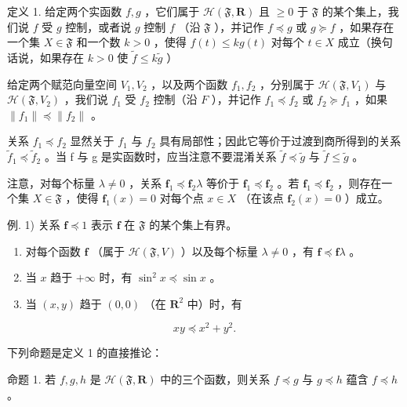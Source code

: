 定义 1. 给定两个实函数 \(f, g\) ，它们属于 \(\mathcal{H}(\mathfrak{F}, \mathbf{R})\) 且 \(\geqslant 0\) 于 \(\mathfrak{F}\) 的某个集上，我们说 \(f\) 受 \(g\) 控制，或者说 \(g\) 控制 \(f\) （沿 \(\mathfrak{F}\) ），并记作 \(f \preccurlyeq g\) 或 \(g \succcurlyeq f\) ，如果存在一个集 \(X \in \mathfrak{F}\) 和一个数 \(k > 0\) ，使得 \(f(t) \leqslant k g(t)\) 对每个 \(t \in X\) 成立（换句话说，如果存在 \(k > 0\) 使 \(\tilde{f} \leqslant k \tilde{g}\) ）

给定两个赋范向量空间 \(V_{1}, V_{2}\) ，以及两个函数 \(f_{1}, f_{2}\) ，分别属于 \(\mathcal{H}(\mathfrak{F}, V_{1})\) 与 \(\mathcal{H}(\mathfrak{F}, V_{2})\) ，我们说 \(f_{1}\) 受 \(f_{2}\) 控制（沿 \(F\) ），并记作 \(f_{1} \preccurlyeq f_{2}\) 或 \(f_{2} \succcurlyeq f_{1}\) ，如果 \(\|f_{1}\| \preccurlyeq \|f_{2}\|\) 。

关系 \(f_{1} \preccurlyeq f_{2}\) 显然关于 \(f_{1}\) 与 \(f_{2}\) 具有局部性；因此它等价于过渡到商所得到的关系 \(\tilde{f}_{1} \preccurlyeq \tilde{f}_{2}\) 。当 f 与 g 是实函数时，应当注意不要混淆关系 \(\tilde{f} \preccurlyeq \tilde{g}\) 与 \(\tilde{f} \leqslant \tilde{g}\) 。

注意，对每个标量 \(\lambda \neq 0\) ，关系 \(\mathbf{f}_1 \preccurlyeq \mathbf{f}_2\lambda\) 等价于 \(\mathbf{f}_1 \preccurlyeq \mathbf{f}_2\) 。若 \(\mathbf{f}_1 \preccurlyeq \mathbf{f}_2\) ，则存在一个集 \(X \in \mathfrak{F}\) ，使得 \(\mathbf{f}_1(x) = 0\) 对每个点 \(x \in X\) （在该点 \(\mathbf{f}_2(x) = 0\) ）成立。

例. 1) 关系 \(\mathbf{f} \preccurlyeq 1\) 表示 \(\mathbf{f}\) 在 \(\mathfrak{F}\) 的某个集上有界。

\begin{enumerate}
\def\labelenumi{\arabic{enumi})}
\setcounter{enumi}{1}
\item
  对每个函数 \(\mathbf{f}\) （属于 \(\mathcal{H}(\mathfrak{F}, V)\) ）以及每个标量 \(\lambda \neq 0\) ，有 \(\mathbf{f} \preccurlyeq \mathbf{f}\lambda\) 。
\item
  当 \(x\) 趋于 \(+\infty\) 时，有 \(\sin^2 x \preccurlyeq \sin x\) 。
\item
  当 \((x,y)\) 趋于 \((0,0)\) （在 \(\mathbf{R}^2\) 中）时，有
\end{enumerate}

\[
x y \preccurlyeq x ^ {2} + y ^ {2}.
\]

下列命题是定义 1 的直接推论：

命题 1. 若 \(f, g, h\) 是 \(\mathcal{H}(\mathfrak{F}, \mathbf{R})\) 中的三个函数，则关系 \(f \preccurlyeq g\) 与 \(g \preccurlyeq h\) 蕴含 \(f \preccurlyeq h\) 。

